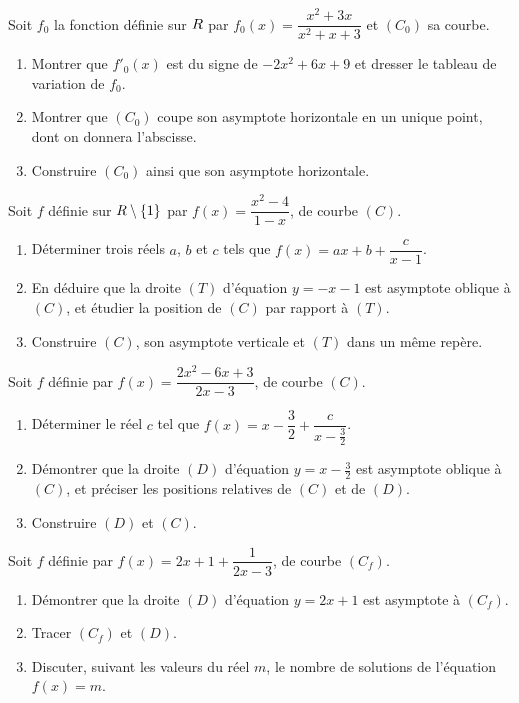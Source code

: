 \begin{annales}
Soit $f_{0}$ la fonction définie sur $R$ par
$f_{0}(x) = \dfrac{x^{2}+3x}{x^{2}+x+3}$ et $(C_{0})$ sa courbe.
\begin{enumerate}[label=\textbf{\alph*)}, leftmargin=*, itemsep=0.15em]
  \item Montrer que $f'_{0}(x)$ est du signe de $-2x^{2}+6x+9$ et dresser le
        tableau de variation de $f_{0}$.
  \item Montrer que $(C_{0})$ coupe son asymptote horizontale en un unique
        point, dont on donnera l'abscisse.
  \item Construire $(C_{0})$ ainsi que son asymptote horizontale.
\end{enumerate}

Soit $f$ définie sur $R\setminus\{1\}$ par $f(x) = \dfrac{x^{2}-4}{1-x}$, de
courbe $(C)$.
\begin{enumerate}[label=\textbf{\alph*)}, leftmargin=*, itemsep=0.15em]
  \item Déterminer trois réels $a$, $b$ et $c$ tels que
        $f(x) = ax+b+\dfrac{c}{x-1}$.
  \item En déduire que la droite $(T)$ d'équation $y = -x-1$ est asymptote
        oblique à $(C)$, et étudier la position de $(C)$ par rapport à $(T)$.
  \item Construire $(C)$, son asymptote verticale et $(T)$ dans un même
        repère.
\end{enumerate}

Soit $f$ définie par $f(x) = \dfrac{2x^{2}-6x+3}{2x-3}$, de courbe $(C)$.
\begin{enumerate}[label=\textbf{\alph*)}, leftmargin=*, itemsep=0.15em]
  \item Déterminer le réel $c$ tel que
        $f(x) = x-\dfrac32+\dfrac{c}{x-\frac32}$.
  \item Démontrer que la droite $(D)$ d'équation $y = x-\frac32$ est
        asymptote oblique à $(C)$, et préciser les positions relatives de
        $(C)$ et de $(D)$.
  \item Construire $(D)$ et $(C)$.
\end{enumerate}

Soit $f$ définie par $f(x) = 2x+1+\dfrac{1}{2x-3}$, de courbe $(C_{f})$.
\begin{enumerate}[label=\textbf{\alph*)}, leftmargin=*, itemsep=0.15em]
  \item Démontrer que la droite $(D)$ d'équation $y = 2x+1$ est asymptote à
        $(C_{f})$.
  \item Tracer $(C_{f})$ et $(D)$.
  \item Discuter, suivant les valeurs du réel $m$, le nombre de solutions de
        l'équation $f(x) = m$.
\end{enumerate}


\end{annales}
